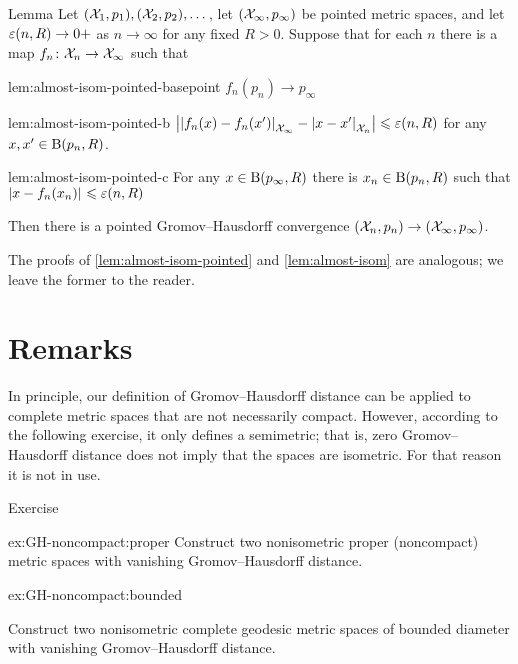 \begin{thm}{Lemma}\label{lem:almost-isom-pointed}
Let $(\mathcal{X}_1, p_1),(\mathcal{X}_2,p_2) ,\dots$, let $(\mathcal{X}_\infty, p_\infty)$ be pointed metric spaces, and let $\varepsilon(n,R)\to0+$ as $n\to\infty$ for any fixed $R>0$.
Suppose that for each $n$ there is a map $f_n\colon\mathcal{X}_n\to\mathcal{X}_\infty$ such that


\begin{subthm}{lem:almost-isom-pointed-basepoint}
$f_n(p_n)\to p_\infty$
\end{subthm}

\begin{subthm}{lem:almost-isom-pointed-b}
$\bigl||{f_n(x)}-{f_n(x')}|_{\mathcal{X}_\infty }^{{}}-|{x}-{x'}|_{\mathcal{X}_n}^{{}}\bigr|\leqslant \varepsilon(n,R)$ for any $x,x'\in \mathrm{B}{}(p_n,R)$.
\end{subthm}

\begin{subthm}{lem:almost-isom-pointed-c}
For any $x \in \mathrm{B}{}(p_\infty,R)$ there is $x_n\in \mathrm{B}{}(p_n,R)$ such that $|{x}-{f_n(x_n)}|_{}^{{}}\leqslant \varepsilon(n,R)$
\end{subthm}

Then there is a pointed  Gromov--Hausdorff convergence $(\mathcal{X}_n,p_n)\to (\mathcal{X}_\infty,p_\infty)$.
\end{thm}

The proofs of \ref{lem:almost-isom-pointed} and \ref{lem:almost-isom} are analogous;
we leave the former to the reader.



\section{Remarks}

In principle, our definition of Gromov--Hausdorff distance can be applied to complete metric spaces that are not necessarily compact.
However, according to the following exercise, it only defines a semimetric; that is, zero Gromov--Hausdorff distance does not imply that the spaces are isometric.
For that reason it is not in use.

\begin{thm}{Exercise}\label{ex:GH-noncompact}
\begin{subthm}{ex:GH-noncompact:proper}
Construct two nonisometric proper (noncompact) metric spaces with vanishing Gromov--Hausdorff distance.
\end{subthm}

\begin{subthm}{ex:GH-noncompact:bounded}

Construct two nonisometric complete geodesic metric spaces of bounded diameter with vanishing Gromov--Hausdorff distance.
\end{subthm}


\end{thm}
